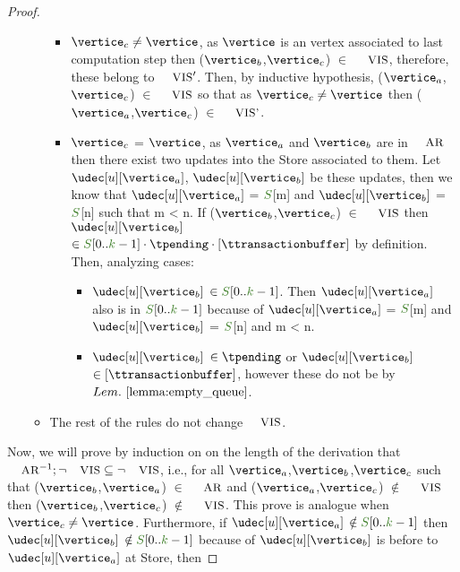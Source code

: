 \begin{proof}
\begin{itemize}
\begin{itemize}
				\begin{itemize}
					\item $\vertice_c \neq \vertice$, as $\vertice$ is an vertex associated to last computation step then ($\vertice_b$,$\vertice_c$) $\in$ $\textsc{\small{VIS}}$, therefore, these belong to $\textsc{\small{VIS}}'$. Then, by inductive hypothesis, ($\vertice_a$,$\vertice_c$) $\in$ $\textsc{\small{VIS}}$ so that as $\vertice_c \neq \vertice$ then ($\vertice_a$,$\vertice_c$) $\in$  $\textsc{\small{VIS}'}$.
					\item $\vertice_c$ = $\vertice$, as $\vertice_a$ and $\vertice_b$ are in $\textsc{\small{AR}}$ then there exist two updates into the Store associated to them. Let $\udec[u][\vertice_a]$, $\udec[u][\vertice_b]$ be these updates, then we know that $\udec[u][\vertice_a]$ = $\queuemessage$[m] and $\udec[u][\vertice_b]$ = $\queuemessage$[n] such that m < n. If ($\vertice_b$,$\vertice_c$) $\in$ $\textsc{\small{VIS}}$ then $\udec[u][\vertice_b]$ $\in \queuemessage[0..\tknown-1] \cdot \tpending \cdot [\ttransactionbuffer]$ by definition. Then, analyzing cases:
					\begin{itemize}
						\item $\udec[u][\vertice_b]$ $\in \queuemessage[0..\tknown-1]$. Then $\udec[u][\vertice_a]$ also is in $\queuemessage[0..\tknown-1]$ because of $\udec[u][\vertice_a]$ = $\queuemessage$[m] and $\udec[u][\vertice_b]$ = $\queuemessage$[n] and m < n.
						\item $\udec[u][\vertice_b]$ $\in \tpending$ or $\udec[u][\vertice_b]$ $\in [\ttransactionbuffer]$, however these do not be by $\lemref{lemma:empty_queue}$.
					\end{itemize}
					
				\end{itemize}
				
			\item The rest of the rules do not change $\textsc{\small{VIS}}$.

\end{itemize}

\end{itemize}

Now, we will prove by induction on on the length of the derivation that $\textsc{\small{AR}}^{-1};\neg\textsc{\small{VIS}} \subseteq \neg\textsc{\small{VIS}}$, i.e., for all $\vertice_a$,$\vertice_b$,$\vertice_c$ such that ($\vertice_b$,$\vertice_a$) $\in$ $\textsc{\small{AR}}$ and ($\vertice_a$,$\vertice_c$) $\notin$ $\textsc{\small{VIS}}$ then ($\vertice_b$,$\vertice_c$) $\notin$ $\textsc{\small{VIS}}$. This prove is analogue when $\vertice_c \neq \vertice$. Furthermore, if $\udec[u][\vertice_a]$ $\notin \queuemessage[0..\tknown-1]$ then $\udec[u][\vertice_b]$ $\notin \queuemessage[0..\tknown-1]$ because of $\udec[u][\vertice_b]$ is before to $\udec[u][\vertice_a]$ at Store, then 
\end{proof}
	